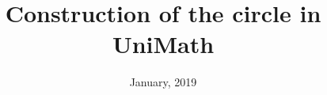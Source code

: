 \title{Construction of the circle in UniMath}
\author{\myauthor}
\address{}
\email{}
\urladdr{}
\date{January, 2019}
\maketitle
{}%
